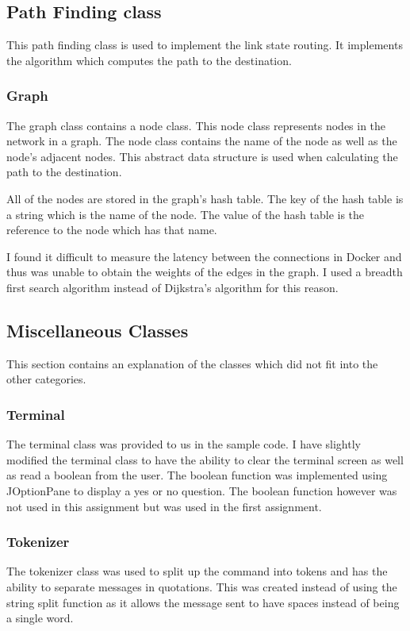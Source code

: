\documentclass{article}
\begin{document}
\subsection{Path Finding class}
This path finding class is used to implement the link state routing. It
implements the algorithm which computes the path to the destination.

\subsubsection{Graph}
The graph class contains a node class. This node class represents nodes in the
network in a graph. The node class contains the name of the node as well as the
node's adjacent nodes. This abstract data structure is used when calculating the
path to the destination.

All of the nodes are stored in the graph's hash table. The key of the hash
table is a string which is the name of the node. The value of the hash table is
the reference to the node which has that name.

I found it difficult to measure the latency between the connections in Docker
and thus was unable to obtain the weights of the edges in the graph. I used a
breadth first search algorithm instead of Dijkstra's algorithm for this reason.

\subsection{Miscellaneous Classes}
This section contains an explanation of the classes which did not fit into the
other categories.

\subsubsection{Terminal}
The terminal class was provided to us in the sample code. I have slightly
modified the terminal class to have the ability to clear the terminal screen
as well as read a boolean from the user. The boolean function was implemented
using JOptionPane to display a yes or no question. The boolean function however
was not used in this assignment but was used in the first assignment.

\subsubsection{Tokenizer}
The tokenizer class was used to split up the command into tokens and has the
ability to separate messages in quotations. This was created instead of using
the string split function as it allows the message sent to have spaces instead
of being a single word.
\end{document}
